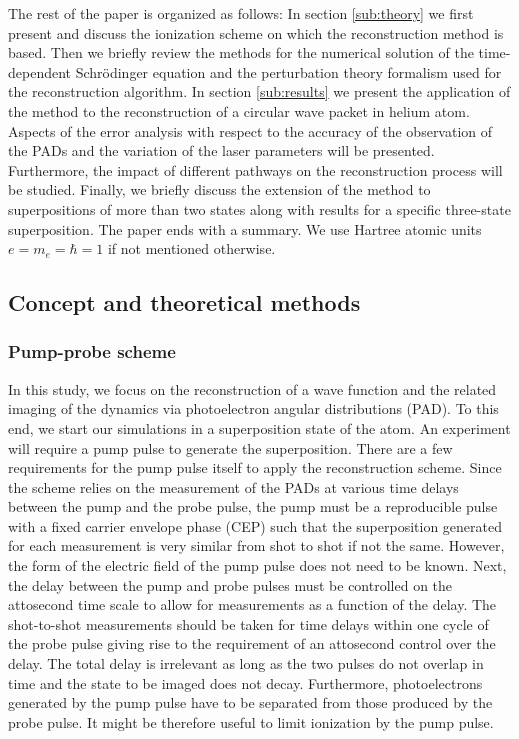 The rest of the paper is organized as follows: In section \ref{sub:theory} we first present and discuss the ionization scheme on which the reconstruction method is based. Then we briefly review the methods for the numerical solution of the time-dependent Schr\"odinger equation and the perturbation theory formalism used for the reconstruction algorithm. In section \ref{sub:results} we present the application of the method to the reconstruction of a circular wave packet in helium atom. Aspects of the error analysis with respect to the accuracy of the observation of the PADs and the variation of the laser parameters will be presented. Furthermore, the impact of different pathways on the reconstruction process will be studied. Finally, we briefly discuss the extension of the method to superpositions of more than two states along with results for a specific three-state superposition. The paper ends with a summary. We use Hartree atomic units $e = m_e = \hbar =1$ if not mentioned otherwise.

\subsection{\label{sub:theory}Concept and theoretical methods}

\subsubsection{Pump-probe scheme}

In this study, we focus on the reconstruction of a wave function and the related imaging of the dynamics via photoelectron angular distributions (PAD). To this end, we start our simulations in a superposition state of the atom. An experiment will require a pump pulse to generate the superposition. There are a few requirements for the pump pulse itself to apply the reconstruction scheme. Since the scheme relies on the measurement of the PADs at various time delays between the pump and the probe pulse, the pump must be a reproducible pulse with a fixed carrier envelope phase (CEP) such that the superposition generated for each measurement is very similar from shot to shot if not the same. However, the form of the electric field of the pump pulse does not need to be known. Next, the delay between the pump and probe pulses must be controlled on the attosecond time scale to allow for measurements as a function of the delay. The shot-to-shot measurements should be taken for time delays within one cycle of the probe pulse giving rise to the requirement of an attosecond control over the delay. The total delay is irrelevant as long as the two pulses do not overlap in time and the state to be imaged does not decay. Furthermore,
photoelectrons generated by the pump pulse have to be separated from those produced by the probe pulse. It might be therefore useful to limit ionization by the pump pulse.

